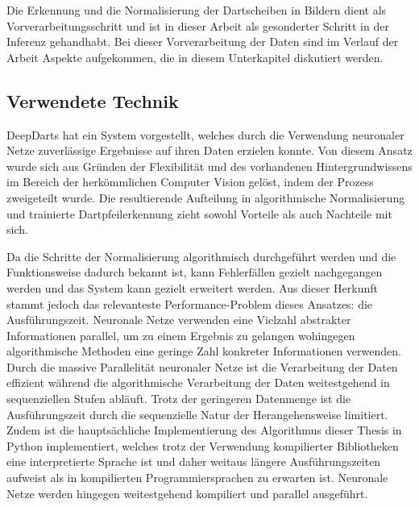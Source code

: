 Die Erkennung und die Normalisierung der Dartscheiben in Bildern dient als Vorverarbeitungsschritt und ist in dieser Arbeit als gesonderter Schritt in der Inferenz gehandhabt. Bei dieser Vorverarbeitung der Daten sind im Verlauf der Arbeit Aspekte aufgekommen, die in diesem Unterkapitel diskutiert werden.

\subsection{Verwendete Technik}

DeepDarts hat ein System vorgestellt, welches durch die Verwendung neuronaler Netze zuverlässige Ergebnisse auf ihren Daten erzielen konnte. Von diesem Ansatz wurde sich aus Gründen der Flexibilität und des vorhandenen Hintergrundwissens im Bereich der herkömmlichen Computer Vision gelöst, indem der Prozess zweigeteilt wurde. Die resultierende Aufteilung in algorithmische Normalisierung und trainierte Dartpfeilerkennung zieht sowohl Vorteile als auch Nachteile mit sich.

Da die Schritte der Normalisierung algorithmisch durchgeführt werden und die Funktionsweise dadurch bekannt ist, kann Fehlerfällen gezielt nachgegangen werden und das System kann gezielt erweitert werden. Aus dieser Herkunft stammt jedoch das relevanteste Performance-Problem dieses Ansatzes: die Ausführungszeit. Neuronale Netze verwenden eine Vielzahl abstrakter Informationen parallel, um zu einem Ergebnis zu gelangen wohingegen algorithmische Methoden eine geringe Zahl konkreter Informationen verwenden. Durch die massive Parallelität neuronaler Netze ist die Verarbeitung der Daten effizient während die algorithmische Verarbeitung der Daten weitestgehend in sequenziellen Stufen abläuft. Trotz der geringeren Datenmenge ist die Ausführungszeit durch die sequenzielle Natur der Herangehensweise limitiert. Zudem ist die hauptsächliche Implementierung des Algorithmus dieser Thesis in Python implementiert, welches trotz der Verwendung kompilierter Bibliotheken eine interpretierte Sprache ist und daher weitaus längere Ausführungszeiten aufweist als in kompilierten Programmiersprachen zu erwarten ist. Neuronale Netze werden hingegen weitestgehend kompiliert und parallel ausgeführt.


